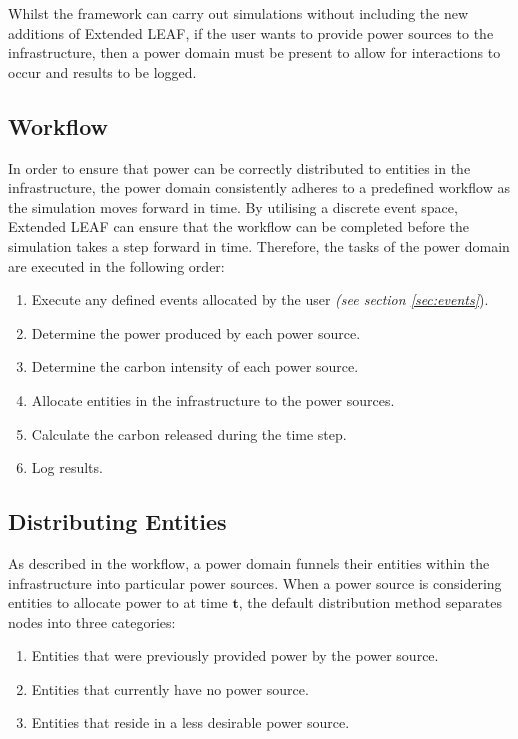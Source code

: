 \documentclass{l4proj}
\begin{document}
Whilst the framework can carry out simulations without including the new additions of Extended LEAF, if the user wants to provide power sources to the infrastructure, then a power domain must be present to allow for interactions to occur and results to be logged.

\subsection{Workflow}\label{subsec:power-domain-workflow}
In order to ensure that power can be correctly distributed to entities in the infrastructure, the power domain consistently adheres to a predefined workflow as the simulation moves forward in time.
By utilising a discrete event space, Extended LEAF can ensure that the workflow can be completed before the simulation takes a step forward in time.
Therefore, the tasks of the power domain are executed in the following order:
\begin{enumerate}
    \item Execute any defined events allocated by the user \emph{(see section \ref{sec:events}}).
    \item Determine the power produced by each power source.
    \item Determine the carbon intensity of each power source.
    \item Allocate entities in the infrastructure to the power sources.
    \item Calculate the carbon released during the time step.
    \item Log results.
\end{enumerate}

\subsection{Distributing Entities}\label{subsec:distributing-entities}
As described in the workflow, a power domain funnels their entities within the infrastructure into particular power sources.
When a power source is considering entities to allocate power to at time $\mathbf{t}$, the default distribution method separates nodes into three categories:
\begin{enumerate}
    \item Entities that were previously provided power by the power source.
    \item Entities that currently have no power source.
    \item Entities that reside in a less desirable power source.
\end{enumerate}
\end{document}
